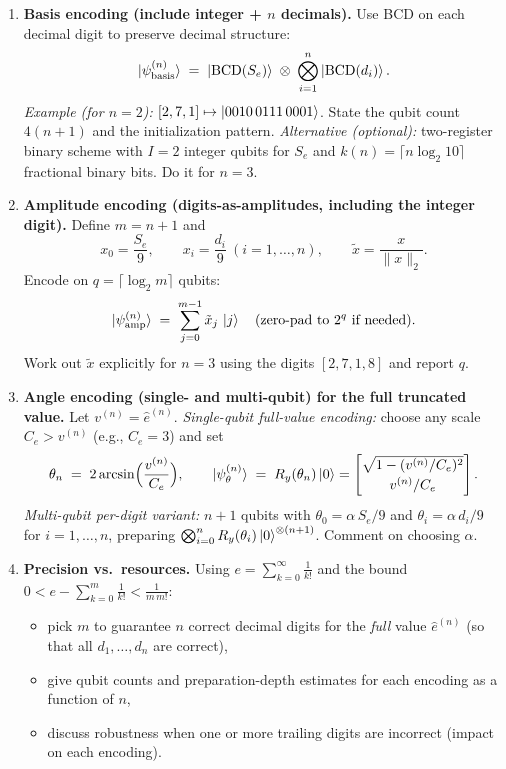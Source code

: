 \documentclass[11pt]{article}
\begin{document}
\begin{enumerate}[label=(\alph*)]
  \item \textbf{Basis encoding (include integer + \(n\) decimals).}
  Use BCD on each decimal digit to preserve decimal structure:
  \[
  \ket{\psi_{\mathrm{basis}}^{(n)}} \;=\; \ket{\mathrm{BCD}(S_e)}\;\otimes\; \bigotimes_{i=1}^{n}\ket{\mathrm{BCD}(d_i)}.
  \]
  \emph{Example (for \(n=2\)):} \([2,7,1]\mapsto \ket{0010\,0111\,0001}\).
  State the qubit count \(4(n{+}1)\) and the initialization pattern.  
  \emph{Alternative (optional):} two-register binary scheme with \(I=2\) integer qubits for \(S_e\) and \(k(n)=\lceil n\log_2 10\rceil\) fractional binary bits. Do it for $n=3$.

  \item \textbf{Amplitude encoding (digits-as-amplitudes, including the integer digit).}
  Define \(m=n{+}1\) and
  \[
  x_0=\frac{S_e}{9},\qquad x_i=\frac{d_i}{9}\ (i=1,\dots,n),\qquad 
  \tilde x=\frac{x}{\|x\|_2}.
  \]
  Encode on \(q=\lceil\log_2 m\rceil\) qubits:
  \[
  \ket{\psi_{\mathrm{amp}}^{(n)}} \;=\; \sum_{j=0}^{m-1}\tilde x_j\,\ket{j}\quad(\text{zero-pad to }2^q\text{ if needed}).
  \]
  Work out \(\tilde x\) explicitly for \(n=3\) using the digits \([2,7,1,8]\) and report \(q\).

  \item \textbf{Angle encoding (single- and multi-qubit) for the full truncated value.}
  Let \(v^{(n)}=\hat e^{(n)}\).  
  \emph{Single-qubit full-value encoding:} choose any scale \(C_e>v^{(n)}\) (e.g., \(C_e=3\)) and set
  \[
  \theta_n \;=\; 2\arcsin\!\Big(\frac{v^{(n)}}{C_e}\Big),\qquad
  \ket{\psi_\theta^{(n)}} \;=\; R_y(\theta_n)\ket{0}
  = \begin{bmatrix}\sqrt{1-(v^{(n)}/C_e)^2}\\[2pt] v^{(n)}/C_e\end{bmatrix}.
  \]
  \emph{Multi-qubit per-digit variant:} \(n{+}1\) qubits with \(\theta_0=\alpha\,S_e/9\) and \(\theta_i=\alpha\,d_i/9\) for \(i=1,\dots,n\), preparing \(\bigotimes_{i=0}^{n} R_y(\theta_i)\ket{0}^{\otimes(n+1)}\). Comment on choosing \(\alpha\).

  \item \textbf{Precision vs.\ resources.}
  Using \(e=\sum_{k=0}^{\infty}\frac{1}{k!}\) and the bound \(0<e-\sum_{k=0}^{m}\frac{1}{k!}<\frac{1}{m\,m!}\):
  \begin{itemize}
    \item pick \(m\) to guarantee \(n\) correct decimal digits for the \emph{full} value \(\hat e^{(n)}\) (so that all \(d_1,\dots,d_n\) are correct),
    \item give qubit counts and preparation-depth estimates for each encoding as a function of \(n\),
    \item discuss robustness when one or more trailing digits are incorrect (impact on each encoding).
  \end{itemize}
\end{enumerate}
\end{document}
